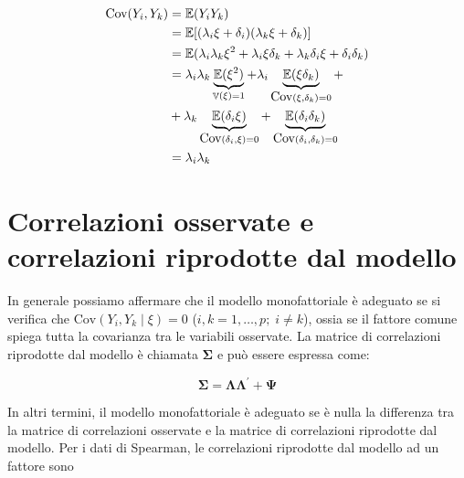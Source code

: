 \documentclass[
  11pt,
]{krantz}
\makeatletter
\newenvironment{Shaded}{\begin{snugshade}}{\end{snugshade}}
\newcommand{\CommentTok}[1]{\textcolor[rgb]{0.37,0.37,0.37}{\textit{#1}}}
\newcommand{\DecValTok}[1]{\textcolor[rgb]{0.06,0.06,0.06}{#1}}
\newcommand{\FunctionTok}[1]{\textcolor[rgb]{0,0,0}{#1}}
\newcommand{\NormalTok}[1]{#1}
\newcommand{\SpecialCharTok}[1]{\textcolor[rgb]{0,0,0}{#1}}
\newenvironment{kframe}{%
\medskip{}
\setlength{\fboxsep}{.8em}
 \def\at@end@of@kframe{}%
 \ifinner\ifhmode%
  \def\at@end@of@kframe{\end{minipage}}%
  \begin{minipage}{\columnwidth}%
 \fi\fi%
 \def\FrameCommand##1{\hskip\@totalleftmargin \hskip-\fboxsep
 \colorbox{shadecolor}{##1}\hskip-\fboxsep
     \hskip-\linewidth \hskip-\@totalleftmargin \hskip\columnwidth}%
 \MakeFramed {\advance\hsize-\width
   \@totalleftmargin\z@ \linewidth\hsize
   \@setminipage}}%
 {\par\unskip\endMakeFramed%
 \at@end@of@kframe}
\renewenvironment{Shaded}{\begin{kframe}}{\end{kframe}}
\DeclareMathOperator{\V}{\mathbb{V}} %
\newcommand{\E}{\mathbb{E}} %
\theoremstyle{definition}
\theoremstyle{definition}
\theoremstyle{definition}
\theoremstyle{definition}
\theoremstyle{remark}
\makeatother
\begin{document}
\begin{equation}
\begin{aligned}
 \mbox{Cov}(Y_i, Y_k) &= \E(Y_i Y_k) \notag\\
  & =\E[(\lambda_i \xi + \delta_i)(\lambda_k \xi +  \delta_k)]\notag\\
  &=\E(\lambda_i\lambda_k\xi^2 + \lambda_i  \xi \delta_k + \lambda_k \delta_i \xi + \delta_i \delta_k)\notag\\
  &=\lambda_i\lambda_k\underbrace{\E(\xi^2)}_{\V(\xi)=1}+\lambda_i\underbrace{\E(\xi \delta_k)}_{\mbox{Cov}(\xi, \delta_k) =0}+\notag\\ \;&+\lambda_k\underbrace{\E(\delta_i \xi)}_{\mbox{Cov}(\delta_i, \xi) =0} +\underbrace{\E(\delta_i \delta_k)}_{\mbox{Cov}(\delta_i, \delta_k)=0}\notag\\
  &=\lambda_i\lambda_k
\end{aligned}
\end{equation}

\hypertarget{correlazioni-osservate-e-correlazioni-riprodotte-dal-modello}{%
\section{Correlazioni osservate e correlazioni riprodotte dal modello}\label{correlazioni-osservate-e-correlazioni-riprodotte-dal-modello}}

In generale possiamo affermare che il modello monofattoriale è adeguato se si verifica che \(\mbox{Cov}(Y_i, Y_k \mid \xi) = 0\) (\(i, k = 1, \dots,p; \; i\neq k\)), ossia se il fattore comune spiega tutta la covarianza tra le variabili osservate. La matrice di correlazioni riprodotte dal modello è chiamata \(\boldsymbol{\Sigma}\) e può essere espressa come:

\[
\boldsymbol{\Sigma} = \boldsymbol{\Lambda} \boldsymbol{\Lambda}^\prime + \boldsymbol{\Psi}
\]

In altri termini, il modello monofattoriale è adeguato se è nulla la differenza tra la matrice di correlazioni osservate e la matrice di correlazioni riprodotte dal modello. Per i dati di Spearman, le correlazioni riprodotte dal modello ad un fattore sono

\begin{Shaded}
\end{Shaded}
\end{document}
